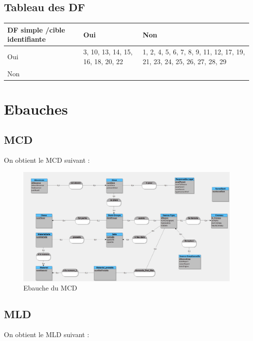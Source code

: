 \documentclass[12pt,french,titlepage]{article}
\begin{document}
    \subsection{Tableau des DF}
    
    \begin{tabular}{|p{4cm}|p{5cm}|p{5cm}|}
    \hline
        DF simple /cible identifiante & Oui & Non\\
        \hline
        Oui &  3, 10, 13, 14, 15, 16, 18, 20, 22  
        & 1, 2, 4, 5, 6, 7, 8, 9, 11, 12, 17, 19, 21, 23, 24, 25, 26, 27, 28, 29 \\
         \hline
        Non & & \\
        \hline
        
        
    \end{tabular}

	    
	   \section{Ebauches}
	   
	   \subsection{MCD}
	   On obtient le MCD suivant :
    \begin{figure}[H]
	      \centering
	      \includegraphics[scale=0.23]{./ebauche_mcd.jpg}
	      \caption{Ebauche du MCD}
	      
	   
	      
	  \end{figure}
	  
	  \subsection{MLD}
	  
	  On obtient le MLD suivant :
\end{document}
